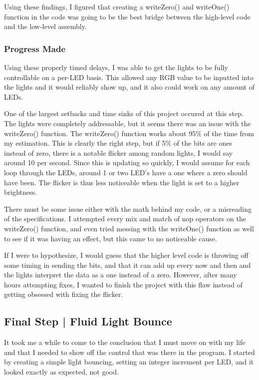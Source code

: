 \documentclass{scrartcl}
\begin{document}
Using these findings, I figured that creating a writeZero() and writeOne() function in the code was going to be the best bridge between the high-level code and the low-level assembly.

\subsubsection{Progress Made}
    Using these properly timed delays, I was able to get the lights to be fully controllable on a per-LED basis. This allowed any RGB value to be inputted into the lights and it would reliably show up, and it also could work on any amount of LEDs. 
    
    One of the largest setbacks and time sinks of this project occured at this step. The lights were completely addressable, but it seems there was an issue with the writeZero() function. The writeZero() function works about 95\% of the time from my estimation. This is clearly the right step, but if 5\% of the bits are ones instead of zero, there is a notable flicker among random lights, I would say around 10 per second. Since this is updating so quickly, I would assume for each loop through the LEDs, around 1 or two LED's have a one where a zero should have been. The flicker is thus less noticeable when the light is set to a higher brightness.

    There must be some issue either with the math behind my code, or a misreading of the specifications. I attempted every mix and match of nop operators on the writeZero() function, and even tried messing with the writeOne() function as well to see if it was having an effect, but this came to no noticeable cause. 
    
    If I were to hypothesize, I would guess that the higher level code is throwing off some timing in sending the bits, and that it can add up every now and then and the lights interpret the data as a one instead of a zero. However, after many hours attempting fixes, I wanted to finish the project with this flaw instead of getting obsessed with fixing the flicker.

\subsection{Final Step | Fluid Light Bounce}

It took me a while to come to the conclusion that I must move on with my life and that I needed to show off the control that was there in the program. I started by creating a simple light bouncing, setting an integer increment per LED, and it looked exactly as expected, not good.
\end{document}
